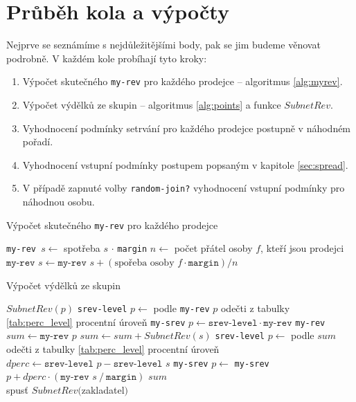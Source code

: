 \documentclass[a4wide,12pt]{report}
\begin{document}
\section{Průběh kola a výpočty}
Nejprve se seznámíme s nejdůležitějšími body, pak se jim budeme věnovat podrobně. V každém kole probíhají tyto kroky:
\begin{enumerate}
\item Výpočet skutečného \texttt{my-rev} pro každého prodejce -- algoritmus \ref{alg:myrev}.
\item Výpočet výdělků ze skupin -- algoritmus \ref{alg:points} a funkce $SubnetRev$.
\item Vyhodnocení podmínky setrvání pro každého prodejce postupně v náhodném pořadí.
\item Vyhodnocení vstupní podmínky postupem popsaným v kapitole \ref{sec:spread}.
\item V případě zapnuté volby \texttt{random-join?} vyhodnocení vstupní podmínky pro náhodnou osobu.
\end{enumerate}
\begin{algorithm}
\caption{Výpočet skutečného \texttt{my-rev} pro každého prodejce}
\label{alg:myrev}
\begin{algorithmic}[]
  \STATE \texttt{my-rev }$s\gets$ spotřeba $s$ $\cdot$ \texttt{margin}
  \STATE{}
    \STATE $n\gets $ počet přátel osoby $f$, kteří jsou prodejci
    \STATE $\texttt{my-rev }s\gets\texttt{my-rev }s+(\text{spořeba osoby }f \cdot \texttt{margin}) / n$
  \ENDFOR
\ENDFOR

\end{algorithmic}
\end{algorithm}

\begin{algorithm}
\caption{Výpočet výdělků ze skupin}
\label{alg:points}
\begin{algorithmic}[]
 $SubnetRev( p )$
  \STATE \texttt{srev-level} $p\gets$ podle \texttt{my-rev} $p$ odečti z tabulky \ref{tab:perc_level} procentní úroveň
  \STATE{}
  \STATE \texttt{my-srev} $p\gets\texttt{srev-level}\cdot\texttt{my-rev}$
   \texttt{my-rev}
\ELSE
  \STATE{}
  \STATE $sum\gets\texttt{my-rev }p$
    \STATE $sum\gets sum + SubnetRev(s)$ 
  \ENDFOR
  \STATE \texttt{srev-level} $p\gets$ podle $sum$ odečti z tabulky \ref{tab:perc_level} procentní úroveň
    \STATE $dperc\gets \texttt{srev-level } p - \texttt{srev-level } s$ 
    \STATE \texttt{my-srev} $p\gets$ \texttt{my-srev} $p+dperc\cdot(\texttt{my-rev }s~/~\texttt{margin})$ 
  \ENDFOR
   $sum$
\ENDIF 
{}
\\
\STATE spusť $SubnetRev($zakladatel$)$
\end{algorithmic}
\end{algorithm}
\clearpage
\end{document}
